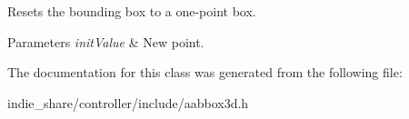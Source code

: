 Resets the bounding box to a one-\/point box. 


\begin{DoxyParams}{Parameters}
{\em init\+Value} & New point. \\
\hline
\end{DoxyParams}


The documentation for this class was generated from the following file\+:\begin{DoxyCompactItemize}
\item 
indie\+\_\+share/controller/include/aabbox3d.\+h\end{DoxyCompactItemize}
